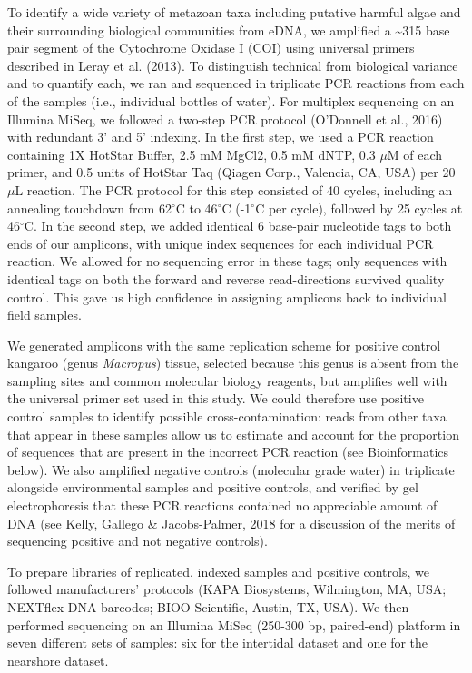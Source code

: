 \documentclass[
]{article}
\begin{document}
To identify a wide variety of metazoan taxa including putative harmful
algae and their surrounding biological communities from eDNA, we
amplified a \textasciitilde315 base pair segment of the Cytochrome
Oxidase I (COI) using universal primers described in Leray et al.
(2013). To distinguish technical from biological variance and to
quantify each, we ran and sequenced in triplicate PCR reactions from
each of the samples (i.e., individual bottles of water). For multiplex
sequencing on an Illumina MiSeq, we followed a two-step PCR protocol
(O'Donnell et al., 2016) with redundant 3' and 5' indexing. In the first
step, we used a PCR reaction containing 1X HotStar Buffer, 2.5 mM MgCl2,
0.5 mM dNTP, 0.3 \(\mu\)M of each primer, and 0.5 units of HotStar Taq
(Qiagen Corp., Valencia, CA, USA) per 20 \(\mu\)L reaction. The PCR
protocol for this step consisted of 40 cycles, including an annealing
touchdown from 62\(^\circ\)C to 46\(^\circ\)C (-1\(^\circ\)C per cycle),
followed by 25 cycles at 46\(^\circ\)C. In the second step, we added
identical 6 base-pair nucleotide tags to both ends of our amplicons,
with unique index sequences for each individual PCR reaction. We allowed
for no sequencing error in these tags; only sequences with identical
tags on both the forward and reverse read-directions survived quality
control. This gave us high confidence in assigning amplicons back to
individual field samples.

We generated amplicons with the same replication scheme for positive
control kangaroo (genus \emph{Macropus}) tissue, selected because this
genus is absent from the sampling sites and common molecular biology
reagents, but amplifies well with the universal primer set used in this
study. We could therefore use positive control samples to identify
possible cross-contamination: reads from other taxa that appear in these
samples allow us to estimate and account for the proportion of sequences
that are present in the incorrect PCR reaction (see Bioinformatics
below). We also amplified negative controls (molecular grade water) in
triplicate alongside environmental samples and positive controls, and
verified by gel electrophoresis that these PCR reactions contained no
appreciable amount of DNA (see Kelly, Gallego \& Jacobs-Palmer, 2018 for
a discussion of the merits of sequencing positive and not negative
controls).

To prepare libraries of replicated, indexed samples and positive
controls, we followed manufacturers' protocols (KAPA Biosystems,
Wilmington, MA, USA; NEXTflex DNA barcodes; BIOO Scientific, Austin, TX,
USA). We then performed sequencing on an Illumina MiSeq (250-300 bp,
paired-end) platform in seven different sets of samples: six for the
intertidal dataset and one for the nearshore dataset.
\end{document}
